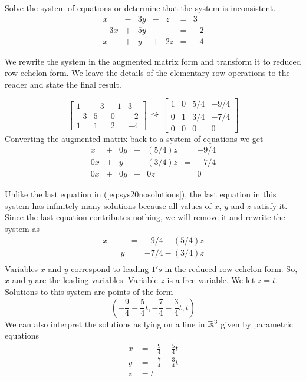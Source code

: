 \documentclass{ximera}
\begin{document}
\begin{example}\label{ex:rrefinfmanysolutionssys}
Solve the system of equations or determine that the system is inconsistent.
$$\begin{array}{ccccccc}
      x & -&3y&-&z&= &3 \\
	 -3x& +&5y&&&=&-2\\
     x&+ &y&+&2z&=&-4
    \end{array}$$
    
    \begin{explanation}
    We rewrite the system in the augmented matrix form and transform it to reduced row-echelon form.  We leave the details of the elementary row operations to the reader and state the final result.
    
   $$ \left[\begin{array}{ccc|c}  
 1&-3&-1&3\\-3&5&0&-2\\1&1&2&-4
 \end{array}\right]\begin{array}{c}
 \\
 \rightsquigarrow\\
 \\
 \end{array}\left[\begin{array}{ccc|c}  
 1&0&5/4&-9/4\\0&1&3/4&-7/4\\0&0&0&0
 \end{array}\right]$$
 Converting the augmented matrix back to a system of equations we get
 $$\begin{array}{ccccccc}
      x &+ &0y&+&(5/4)z&= &-9/4 \\
	 0x& +&y&+&(3/4)z&=&-7/4\\
     0x&+ &0y&+&0z&=&0
    \end{array}$$
    
 Unlike the last equation in (\ref{eq:sys20nosolutions}), the last equation in this system has infinitely many solutions because all values of $x$, $y$ and $z$ satisfy it.  Since the last equation contributes nothing, we will remove it and rewrite the system as
 $$\begin{array}{ccccc}
      x & &&= &-9/4-(5/4)z \\
	 & &y&=&-7/4-(3/4)z\\
    \end{array}$$
Variables $x$ and $y$ correspond to leading $1's$ in the reduced row-echelon form.  So, $x$ and $y$ are the leading variables.    Variable $z$ is a free variable.  We let $z=t$.  Solutions to this system are points of the form
  $$\left(-\frac{9}{4}-\frac{5}{4}t, -\frac{7}{4}-\frac{3}{4}t, t\right)$$
  We can also interpret the solutions as lying on a line in $\mathbb{R}^3$ given by parametric equations
  \begin{align*}
  x&=-\frac{9}{4}-\frac{5}{4}t\\
  y&=-\frac{7}{4}-\frac{3}{4}t\\
  z&=t\\
  \end{align*}
  

\end{explanation}
\end{example}
\end{document}
